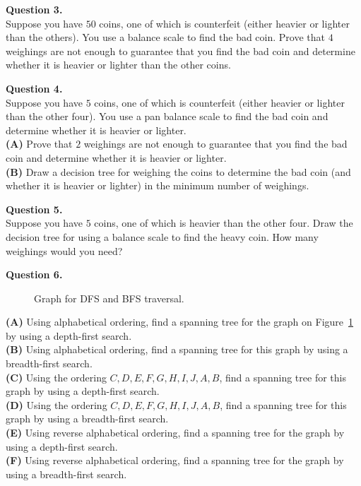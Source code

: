 \documentclass[jou]{apa6}
\begin{document}
\vspace{10pt}
{\bf Question 3.}\\
Suppose you have $50$ coins, one of which is counterfeit 
(either heavier or lighter than the others). You use a
balance scale to find the bad coin. Prove that $4$ weighings 
are not enough to guarantee that you find the
bad coin and determine whether 
it is heavier or lighter than the other coins.


\vspace{10pt}
{\bf Question 4.}\\
Suppose you have $5$ coins, one of which is counterfeit 
(either heavier or lighter than the other four). You use
a pan balance scale to find the bad coin and determine 
whether it is heavier or lighter.\\
{\bf (A)} Prove that $2$ weighings are not enough to guarantee 
that you find the bad coin and determine whether it
is heavier or lighter.\\
{\bf (B)}  Draw a decision tree for weighing the coins to determine 
the bad coin (and whether it is heavier or lighter)
in the minimum number of weighings.


\vspace{10pt}
{\bf Question 5.}\\
Suppose you have $5$ coins, one of which is heavier than the other four. 
Draw the decision tree for using a
balance scale to find the heavy coin. How many weighings would you need?



\vspace{10pt}
{\bf Question 6.} 
\begin{figure}[!htb]
\caption{\label{fig:quiz12-graph} Graph for DFS and BFS traversal.}
\end{figure}


{\bf (A)} Using alphabetical ordering, find a spanning tree for the graph on Figure~\ref{fig:quiz12-graph} by using a depth-first search.\\
{\bf (B)} Using alphabetical ordering, find a spanning tree for this graph by using a breadth-first search.\\
{\bf (C)} Using the ordering $C, D, E, F, G, H, I, J, A, B$, find a spanning tree for this graph by using a depth-first search.\\
{\bf (D)} Using the ordering $C, D, E, F, G, H, I, J, A, B$, find a spanning tree for this graph by using a breadth-first search.\\
{\bf (E)} Using reverse alphabetical ordering, find a spanning tree for the graph by using a depth-first search.\\
{\bf (F)} Using reverse alphabetical ordering, find a spanning tree for the graph by using a breadth-first search.
\end{document}
